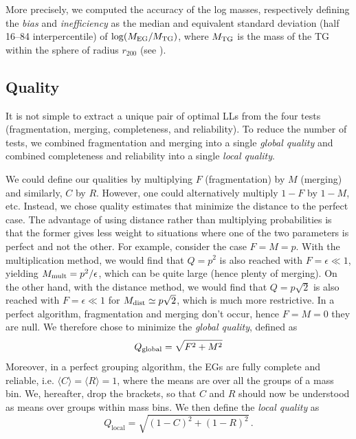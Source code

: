 More precisely, we computed the accuracy of the log masses, respectively
defining the \emph{bias} and \emph{inefficiency} as the median and equivalent
standard deviation (half 16--84 interpercentile) of $\log (M_{\rm EG}/M_{\rm
TG})$, where $M_{\rm TG}$ is the mass of the TG within the sphere of radius
$r_{200}$ (see ).

\subsection{Quality}

It is not simple to extract a unique pair of optimal LLs from the four tests
(fragmentation, merging, completeness, and reliability). To reduce the number
of tests, we combined fragmentation and merging into a single \emph{global
quality} and combined completeness and reliability into a single \emph{local
quality}.

We could define our qualities by multiplying $F$ (fragmentation) by $M$
(merging) and similarly, $C$ by $R$. However, one could alternatively multiply
$1-F$ by $1-M$, etc. Instead, we chose quality estimates that minimize the
distance to the perfect case. The advantage of using distance rather than
multiplying probabilities is that the former gives less weight to situations
where one of the two parameters is perfect and not the other. For example,
consider the case $F=M=p$. With the multiplication method, we would find that
$Q=p^2$ is also reached with $F=\epsilon\ll 1$, yielding $M_{\rm
mult}=p^2/\epsilon$, which can be quite large (hence plenty of merging). On the
other hand, with the distance method, we would find that $Q=p\sqrt{2}$ is also
reached with $F=\epsilon\ll1$ for $M_{\rm dist}\simeq p\sqrt{2}$, which is much
more restrictive. In a perfect algorithm, fragmentation and merging don't
occur, hence $F=M=0$ they are null. We therefore chose to minimize the
\emph{global quality}, defined as
%
\begin{equation}
    Q_{\rm global} = \sqrt{F^2+M^2}
\end{equation}
%
Moreover, in a perfect grouping algorithm, the EGs are fully complete and
reliable, i.e. $\langle C\rangle=\langle R\rangle=1$, where the means are over
all the groups of a mass bin. We, hereafter, drop the brackets, so that $C$ and
$R$ should now be understood as means over groups within mass bins. We then
define the \emph{local quality} as
%
\begin{equation}
    Q_{\mathrm{local}}=\sqrt{{\left(1-
    C\right)}^2+{\left(1- R\right)}^2} \,.
\end{equation}

